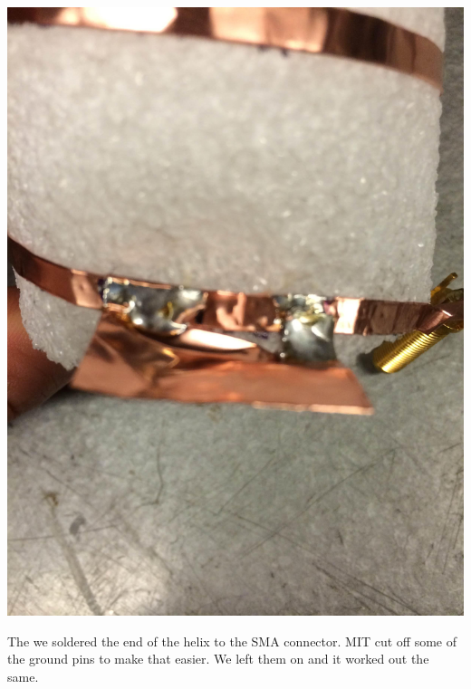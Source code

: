 \documentclass[11pt]{article} %
\begin{document}
\begin{center}
\includegraphics[scale=0.10]{feed/13.jpeg}
\end{center}


The we soldered the end of the helix to the SMA connector. MIT cut off some of the ground pins to make that easier. We left them on and it worked out the same. 
\end{document}
